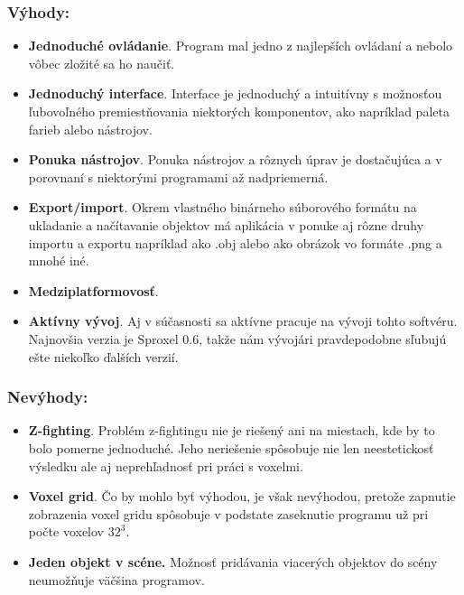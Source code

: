 \subsubsection{Výhody:}
\begin{itemize}
	\item \textbf{Jednoduché ovládanie}. Program mal jedno z najlepších ovládaní a nebolo vôbec zložité sa ho naučiť.
	\item \textbf{Jednoduchý interface}. Interface je jednoduchý a intuitívny s možnosťou ľubovoľného premiestňovania niektorých komponentov, ako napríklad paleta farieb alebo nástrojov.
	\item \textbf{Ponuka nástrojov}. Ponuka nástrojov a rôznych úprav je dostačujúca a v porovnaní s niektorými programami až nadpriemerná.
	\item \textbf{Export/import}. Okrem vlastného binárneho súborového formátu na ukladanie a načítavanie objektov má aplikácia v ponuke aj rôzne druhy importu a exportu napríklad ako .obj alebo ako obrázok vo formáte .png a mnohé iné.
	\item \textbf{Medziplatformovosť}. 
	\item \textbf{Aktívny vývoj}. Aj v súčasnosti sa aktívne pracuje na vývoji tohto softvéru. Najnovšia verzia je Sproxel 0.6, takže nám vývojári pravdepodobne sľubujú ešte niekoľko ďalších verzií.
\end{itemize}
\subsubsection{Nevýhody:}
\begin{itemize}
	\item \textbf{Z-fighting}. Problém z-fightingu nie je riešený ani na miestach, kde by to bolo pomerne jednoduché. Jeho neriešenie spôsobuje nie len neestetickosť výsledku ale aj neprehľadnosť pri práci s voxelmi.
	\item \textbf{Voxel grid}. Čo by mohlo byť výhodou, je však nevýhodou, pretože zapnutie zobrazenia voxel gridu spôsobuje v podstate zaseknutie programu už pri počte voxelov \begin{math}32^3\end{math}.
	\item \textbf{Jeden objekt v scéne.} Možnosť pridávania viacerých objektov do scény neumožňuje väčšina programov.
\end{itemize}


